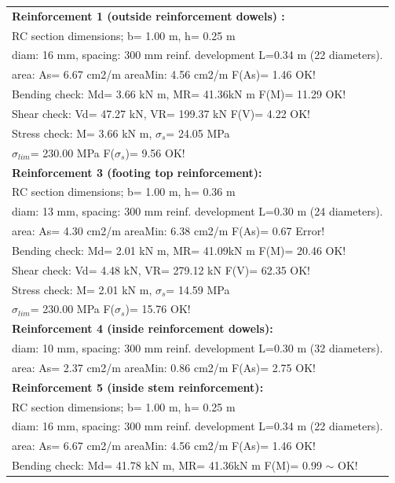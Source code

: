 \begin{center}
\begin{supertabular}[H]{|l|}
\hline
\textbf{Reinforcement 1 (outside reinforcement dowels) :} \\
  RC section dimensions; b= 1.00 m, h= 0.25 m\\
  diam: 16 mm, spacing: 300 mm  reinf. development L=0.34 m (22 diameters).\\
  area: As=   6.67 cm2/m areaMin:   4.56 cm2/m  F(As)= 1.46 OK!\\
  Bending check: Md=   3.66 kN m, MR=  41.36kN m  F(M)= 11.29 OK!\\
  Shear check: Vd=  47.27 kN,  VR= 199.37 kN  F(V)= 4.22 OK!\\
  Stress check: M=   3.66 kN m, $\sigma_s$=  24.05 MPa\\
    $\sigma_{lim}$= 230.00 MPa  F($\sigma_s$)= 9.56 OK!\\
\textbf{Reinforcement 3 (footing top reinforcement):}\\
  RC section dimensions; b= 1.00 m, h= 0.36 m\\
  diam: 13 mm, spacing: 300 mm  reinf. development L=0.30 m (24 diameters).\\
  area: As=   4.30 cm2/m areaMin:   6.38 cm2/m  F(As)= 0.67 Error!\\
  Bending check: Md=   2.01 kN m, MR=  41.09kN m  F(M)= 20.46 OK!\\
  Shear check: Vd=   4.48 kN,  VR= 279.12 kN  F(V)= 62.35 OK!\\
  Stress check: M=   2.01 kN m, $\sigma_s$=  14.59 MPa\\
    $\sigma_{lim}$= 230.00 MPa  F($\sigma_s$)= 15.76 OK!\\
\textbf{Reinforcement 4 (inside reinforcement dowels):}\\
  diam: 10 mm, spacing: 300 mm  reinf. development L=0.30 m (32 diameters).\\
  area: As=   2.37 cm2/m areaMin:   0.86 cm2/m  F(As)= 2.75 OK!\\
\textbf{Reinforcement 5 (inside stem reinforcement):}\\
  RC section dimensions; b= 1.00 m, h= 0.25 m\\
  diam: 16 mm, spacing: 300 mm  reinf. development L=0.34 m (22 diameters).\\
  area: As=   6.67 cm2/m areaMin:   4.56 cm2/m  F(As)= 1.46 OK!\\
  Bending check: Md=  41.78 kN m, MR=  41.36kN m  F(M)= 0.99 $\sim$ OK!\\

\end{supertabular}
\end{center}
